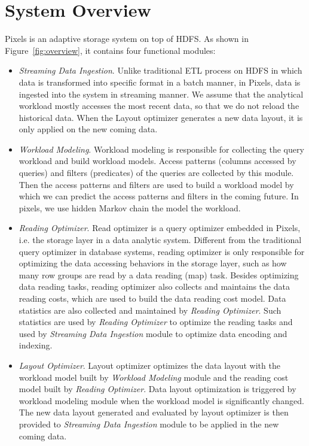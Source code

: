 \section{System Overview}

Pixels is an adaptive storage system on top of HDFS.
As shown in Figure~\ref{fig:overview}, it contains four functional modules:
\begin{itemize}
	\item \textit{Streaming Data Ingestion}. Unlike traditional ETL process on HDFS in which data is transformed into specific format in a batch manner, in Pixels, data is ingested into the system in streaming manner. We assume that the analytical workload mostly accesses the most recent data, so that we do not reload the historical data. When the Layout optimizer generates a new data layout, it is only applied on the new coming data.
	
	\item \textit{Workload Modeling}. Workload modeling is responsible for collecting the query workload and build workload models. Access patterns (columns accessed by queries) and filters (predicates) of the queries are collected by this module.
	Then the access patterns and filters are used to build a workload model by which we can predict the access patterns and filters in the coming future. In pixels, we use hidden Markov chain the model the workload.
	
	\item \textit{Reading Optimizer}. Read optimizer is a query optimizer embedded in Pixels, i.e. the storage layer in a data analytic system. Different from the traditional query optimizer in database systems, reading optimizer is only responsible for optimizing the data accessing behaviors in the storage layer, such as how many row groups are read by a data reading (map) task.
	Besides optimizing data reading tasks, reading optimizer also collects and maintains the data reading costs, which are used to build the data reading cost model. Data statistics are also collected and maintained by \textit{Reading Optimizer}. Such statistics are used by \textit{Reading Optimizer} to optimize the reading tasks and used by \textit{Streaming Data Ingestion} module to optimize data encoding and indexing.
	
	\item \textit{Layout Optimizer}. Layout optimizer optimizes the data layout with the workload model built by \textit{Workload Modeling} module and the reading cost model built by \textit{Reading Optimizer}. Data layout optimization is triggered by workload modeling module when the workload model is significantly changed. The new data layout generated and evaluated by layout optimizer is then provided to \textit{Streaming Data Ingestion} module to be applied in the new coming data.
	
	
\end{itemize}


